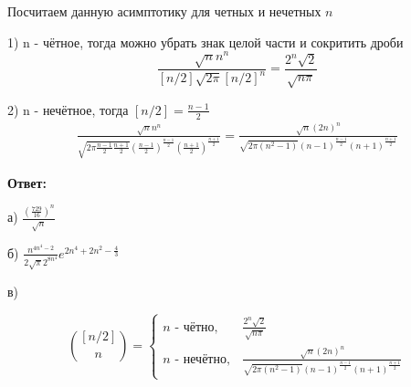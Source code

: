 \documentclass[a4paper, 11pt]{article}
\begin{document}
Посчитаем данную асимптотику для четных и нечетных $n$

1) n - чётное, тогда можно убрать знак целой части и сокритить дроби 
\[
\frac{\sqrt{n}n^n}{[n/2]\sqrt{2\pi} [n/2]^n} = \frac{2^n\sqrt{2}}{\sqrt{n\pi}}
\]

2) n - нечётное, тогда $[n/2] = \frac{n-1}{2}$
\begin{equation*}
\begin{aligned}
\frac{\sqrt{n}n^n}{
	\sqrt{2\pi\frac{n-1}{2}\frac{n+1}{2}}
	\left(\frac{n-1}{2}\right)^{\frac{n-1}{2}}
	\left(\frac{n+1}{2}\right)^{\frac{n+1}{2}}
}
 = 
\frac{\sqrt{n}(2n)^n}{
 	\sqrt{2\pi(n^2-1)}
 	(n-1)^{\frac{n-1}{2}}
 	(n+1)^{\frac{n+1}{2}}
}
\end{aligned}
\end{equation*}

\textbf{Ответ:}

а) $\frac{\left(\frac{729}{16}\right)^n}{\sqrt{n}}$

б) $\frac{n^{4n^4-2}}{2\sqrt{\pi} 2^{8n^4}}e^{    2n^4 + 2n^2 -\frac{4}{3} }$

в)

\begin{equation*}
\binom{[n/2]}{n} = 
\begin{cases}
	n \text{ - чётно}, & \frac{2^n\sqrt{2}}{\sqrt{n\pi}} \\
	n \text{ - нечётно}, &
	\frac{\sqrt{n}(2n)^n}{
		\sqrt{2\pi(n^2-1)}
		(n-1)^{\frac{n-1}{2}}
		(n+1)^{\frac{n+1}{2}}
	}
\end{cases}
\end{equation*}
\end{document}
